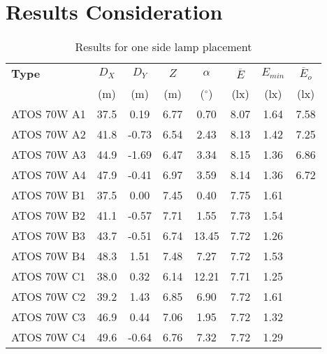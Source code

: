 \section{Results Consideration}

\begin{table}[htb]
	\renewcommand{\arraystretch}{1.3}
	\caption{Results for one side lamp placement}
 	\label{tab:onesideLamps}
	\centering
  \begin{tabular}{ l | c | c | c | c | c | c | c }
    \hline
    \textbf{Type} & $D_X$ & $D_Y$ & $Z$ & $\alpha$ & $\overline{E}$ & $E_{min}$ & $\overline{E}_o$\\ 
    & (m) & (m) & (m) & ($^\circ$) & (lx) & (lx) & (lx)\\ \hline
    ATOS 70W A1 & 37.5 & 0.19 & 6.77 & 0.70 & 8.07 & 1.64 & 7.58 \\ \hline
    ATOS 70W A2 & 41.8 & -0.73 & 6.54 & 2.43 & 8.13 & 1.42 & 7.25\\ \hline
    ATOS 70W A3 & 44.9 & -1.69 & 6.47 & 3.34 & 8.15 & 1.36 & 6.86\\ \hline
    ATOS 70W A4 & 47.9 & -0.41 & 6.97 & 3.59 & 8.14 & 1.36 & 6.72\\ \hline\hline
    ATOS 70W B1 & 37.5 & 0.00 & 7.45 & 0.40 & 7.75 & 1.61\\ \hline
    ATOS 70W B2 & 41.1 & -0.57 & 7.71 & 1.55 & 7.73 & 1.54\\ \hline
    ATOS 70W B3 & 43.7 & -0.51 & 6.74 & 13.45 & 7.72 & 1.26\\ \hline
    ATOS 70W B4 & 48.3 & 1.51 & 7.48 & 7.27 & 7.72 & 1.53\\ \hline\hline
    ATOS 70W C1 & 38.0 & 0.32 & 6.14 & 12.21 & 7.71 & 1.25\\ \hline
    ATOS 70W C2 & 39.2 & 1.43 & 6.85 & 6.90 & 7.72 & 1.61\\ \hline
    ATOS 70W C3 & 46.9 & 0.44 & 7.06 & 1.95 & 7.72 & 1.32\\ \hline
    ATOS 70W C4 & 49.6 & -0.64 & 6.76 & 7.32 & 7.72 & 1.29\\ \hline
  \end{tabular}
\end{table}

